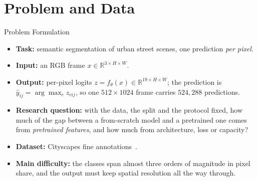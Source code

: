 
\section{Problem and Data}

\begin{frame}{Problem Formulation}
\begin{itemize}
    \item \textbf{Task:} semantic segmentation of urban street scenes, one prediction \emph{per pixel}.
    \item \textbf{Input:} an RGB frame $x \in \mathbb{R}^{3 \times H \times W}$.
    \item \textbf{Output:} per-pixel logits $z = f_\theta(x) \in \mathbb{R}^{19 \times H \times W}$;
          the prediction is $\hat{y}_{ij} = \arg\max_c z_{cij}$, so one $512 \times 1024$ frame
          carries $524{,}288$ predictions.
    \item \textbf{Research question:} with the data, the split and the protocol fixed, how much of
          the gap between a from-scratch model and a pretrained one comes from \emph{pretrained
          features}, and how much from architecture, loss or capacity?
    \item \textbf{Dataset:} Cityscapes fine annotations~\cite{cordts2016cityscapes}.
    \item \textbf{Main difficulty:} the classes span almost three orders of magnitude in pixel
          share, and the output must keep spatial resolution all the way through.
\end{itemize}
\end{frame}

